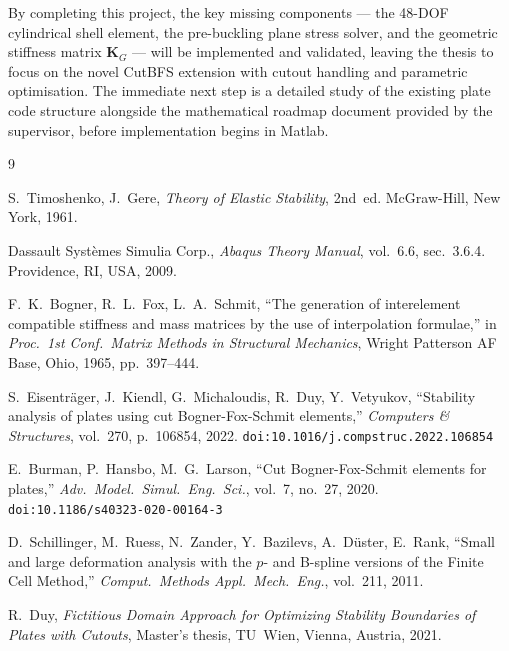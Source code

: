 \documentclass[9pt,a4paper,twoside]{tau-class/tau}
\begin{document}
By completing this project, the key missing components --- the 48-DOF
cylindrical shell element, the pre-buckling plane stress solver, and the
geometric stiffness matrix $\mathbf{K}_G$ --- will be implemented and
validated, leaving the thesis to focus on the novel CutBFS extension with
cutout handling and parametric optimisation. The immediate next step is a
detailed study of the existing plate code structure alongside the
mathematical roadmap document provided by the supervisor, before
implementation begins in Matlab.


\begin{thebibliography}{9}

S.~Timoshenko, J.~Gere,
\textit{Theory of Elastic Stability}, 2nd~ed.
McGraw-Hill, New York, 1961.

Dassault Syst\`{e}mes Simulia Corp.,
\textit{Abaqus Theory Manual}, vol.~6.6, sec.~3.6.4.
Providence, RI, USA, 2009.

F.~K.~Bogner, R.~L.~Fox, L.~A.~Schmit,
``The generation of interelement compatible stiffness and mass matrices
by the use of interpolation formulae,''
in \textit{Proc.\ 1st Conf.\ Matrix Methods in Structural Mechanics},
Wright Patterson AF Base, Ohio, 1965, pp.~397--444.

S.~Eisentr\"{a}ger, J.~Kiendl, G.~Michaloudis, R.~Duy, Y.~Vetyukov,
``Stability analysis of plates using cut Bogner-Fox-Schmit elements,''
\textit{Computers \& Structures}, vol.~270, p.~106854, 2022.
\texttt{doi:10.1016/j.compstruc.2022.106854}

E.~Burman, P.~Hansbo, M.~G.~Larson,
``Cut Bogner-Fox-Schmit elements for plates,''
\textit{Adv.\ Model.\ Simul.\ Eng.\ Sci.}, vol.~7, no.~27, 2020.
\texttt{doi:10.1186/s40323-020-00164-3}

D.~Schillinger, M.~Ruess, N.~Zander, Y.~Bazilevs, A.~D\"{u}ster, E.~Rank,
``Small and large deformation analysis with the $p$- and B-spline versions
of the Finite Cell Method,''
\textit{Comput.\ Methods Appl.\ Mech.\ Eng.}, vol.~211, 2011.

R.~Duy,
\textit{Fictitious Domain Approach for Optimizing Stability Boundaries of
Plates with Cutouts},
Master's thesis, TU~Wien, Vienna, Austria, 2021.

\end{thebibliography}
\end{document}
